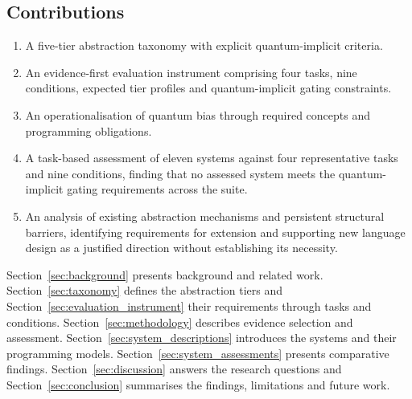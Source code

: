 \subsection{Contributions}\label{subsec:introduction:contributions}
\begin{enumerate}
    \item A five-tier abstraction taxonomy with explicit quantum-implicit criteria.
    \item An evidence-first evaluation instrument comprising four tasks, nine conditions, expected tier profiles and quantum-implicit gating constraints.
    \item An operationalisation of quantum bias through required concepts and programming obligations.
    \item A task-based assessment of eleven systems against four representative tasks and nine conditions, finding that no assessed system meets the quantum-implicit gating requirements across the suite.
    \item An analysis of existing abstraction mechanisms and persistent structural barriers, identifying requirements for extension and supporting new language design as a justified direction without establishing its necessity.
\end{enumerate}

Section~\ref{sec:background} presents background and related work.
Section~\ref{sec:taxonomy} defines the abstraction tiers and Section~\ref{sec:evaluation_instrument} their requirements through tasks and conditions.
Section~\ref{sec:methodology} describes evidence selection and assessment.
\ifthesis
Section~\ref{sec:system_descriptions} introduces the systems and their programming models.
\fi
Section~\ref{sec:system_assessments} presents comparative findings.
Section~\ref{sec:discussion} answers the research questions and Section~\ref{sec:conclusion} summarises the findings, limitations and future work.